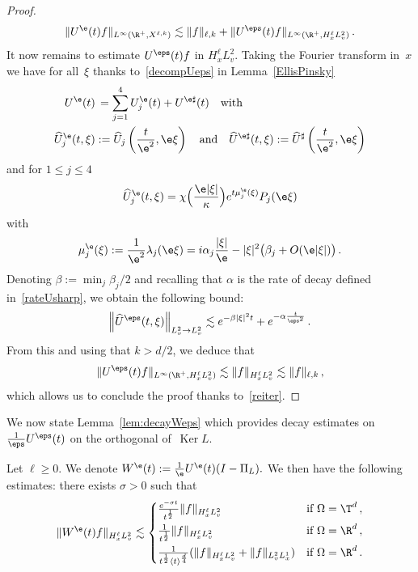 \begin{proof}
\begin{equation}
\|U^\e(t)f\|_{L^\infty(\R^+,X^{\ell,k})}\lesssim \|f\|_{\ell,k} + \|U^\eps(t) f \|_{L^\infty(\R^+,H^\ell_xL^2_v)} \,.
\end{equation}
It now remains to estimate $U^\eps(t)f$ in $H^\ell_xL^2_v$. Taking the Fourier transform in~$x$ we have for all~$\xi $ thanks to~\eqref{decompUeps} in Lemma~\ref{EllisPinsky}
\begin{equation}\label{decUepsEP}
\begin{aligned}
U^\e(t) &\,= \sum_{j=1}^4 U_j^\e(t) + U^{\e\sharp}(t) \quad \text{with} \\
\widehat U_j^\e(t,\xi) &:= \widehat U_j\left(\frac{t}{\e^2},\e \xi\right) \quad \text{and} \quad\widehat U^{\e\sharp}(t,\xi) := \widehat U^\sharp\left(\frac{t}{\e^2},\e \xi\right)
\end{aligned}
\end{equation}
and for $1\le j \le 4$
\[
\widehat U^\e_j(t,\xi) = \chi\Big(\frac{\e |\xi|}\kappa\Big) e^{t \mu_j^\e(\xi)} P_j(\e \xi)
\]
with
\[
\mu_j^\e(\xi):=\frac{1}{\e^2} \lambda_j(\e \xi) = i \alpha_j \frac{|\xi|}{\e} - |\xi|^2\big(\beta_j + O(\e |\xi|)\big) \,.
\]
Denoting $\beta := \min_j \beta_j/2$ and recalling that $\alpha$ is the rate of decay defined in~\eqref{rateUsharp}, we obtain the following bound:
\[
\left\|\widehat U^\eps(t,\xi)\right\|_{L^2_v \to L^2_v} \lesssim e^{-\beta |\xi|^2 t} + e^{-\alpha \frac{t}{\eps^2}} \,.
\]
From this and using that $k >d/2$, we deduce that
\[
\|U^\eps(t) f \|_{L^\infty(\R^+,H^\ell_xL^2_v)} \lesssim \|f\|_{H^\ell_xL^2_v} \lesssim \|f\|_{\ell,k}\,,
\]
which allows us to conclude the proof thanks to~\eqref{reiter}.
\end{proof}

We now state Lemma~\ref{lem:decayWeps} which provides decay estimates on $\frac1\eps U^\eps(t)$ on the orthogonal of~$\operatorname{Ker} L$.

\begin{lemm}\label{lem:decayWeps}
Let $\ell\ge 0$. We denote $ W^\e (t):=\frac 1\e U^\e (t)(I-\Pi_{L}). $ We then have the following estimates: there exists $\sigma>0$ such that
\[
\|W^\e(t)f\|_{H^\ell_xL^2_v} \lesssim
\begin{cases}
\frac{e^{-\sigma t}}{t^{\frac12}} \|f\|_{H^\ell_xL^2_v} &\text{if } \Omega = \T^d \,, \\[0.5em]
\frac{1}{t^{\frac12}} \|f\|_{H^\ell_xL^2_v} &\text{if } \Omega = \R^d\,, \\[0.5em]
\frac{1}{{t^{\frac12} \langle t \rangle^\frac{d}{4}}} (\|f\|_{H^\ell_xL^2_v} + \|f\|_{L^2_vL^1_x}) &\text{if } \Omega = \R^d \,.
\end{cases}
\]
\end{lemm}


